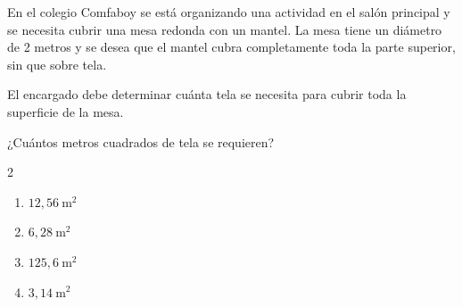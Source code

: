 En el colegio Comfaboy se está organizando una actividad en el salón principal y se necesita cubrir una mesa redonda con un mantel. La mesa tiene un diámetro de 2 metros y se desea que el mantel cubra completamente toda la parte superior, sin que sobre tela.

El encargado debe determinar cuánta tela se necesita para cubrir toda la superficie de la mesa.

¿Cuántos metros cuadrados de tela se requieren?

\begin{multicols}{2}
\begin{enumerate}[label=\alph*), leftmargin=*]
\item $12{,}56\ \text{m}^2$
\item $6{,}28\ \text{m}^2$
\item $125{,}6\ \text{m}^2$
\item $3{,}14\ \text{m}^2$
\end{enumerate}
\end{multicols}